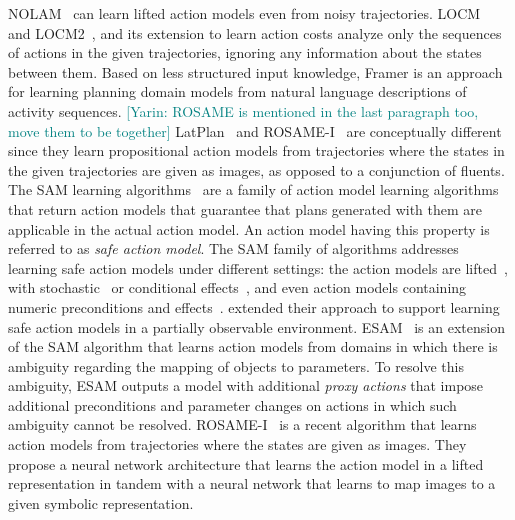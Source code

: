 \documentclass{article}
\theoremstyle{definition}
\theoremstyle{remark}
\newcommand{\sam}{\ac{SAM}\xspace}
\newcommand{\yarin}[1]{{\textcolor{teal}{[Yarin: #1]}}}
\begin{document}
NOLAM~\citep{Lamanna24} can learn lifted action models even from noisy trajectories. 
LOCM~\citep{cresswell2011generalised} and LOCM2~\citep{cresswell2013acquiring}, and its extension to learn action costs \citep{gregory2016domain} analyze only the sequences of actions in the given trajectories, ignoring any information about the states between them. Based on less structured input knowledge, Framer \citep{lindsay2017framer} is an approach for learning planning domain models from natural language descriptions of activity sequences.
\yarin{ROSAME is mentioned in the last paragraph too, move them to be together}
LatPlan~\citep{asai2018classical} and ROSAME-I~\citep{xi2024neuro} are conceptually different since they learn propositional action models from trajectories where the states in the given trajectories are given as images, as opposed to a conjunction of fluents. 
The \sam learning algorithms~\citep{stern2017efficient,mordoch2023learning,juba2021safe,juba2022learning,le2024learning,mordoch2024safe} are a family of action model learning algorithms that return action models that guarantee that plans generated with them are applicable in the actual action model. 
An action model having this property is referred to as \emph{safe action model}.
The \sam family of algorithms addresses learning safe action models under different settings: 
the action models are lifted~\citep{juba2021safe}, with stochastic~\citep{juba2022learning} or conditional effects~\citep{mordoch2024safe}, and even action models containing numeric preconditions and effects~\citep{mordoch2023learning}.
\citet{le2024learning} extended their approach to support learning safe action models in a partially observable environment. 
ESAM~\citep{juba2021safe} is an extension of the \sam algorithm that learns action models from domains in which there is ambiguity regarding the mapping of objects to parameters. To resolve this ambiguity, ESAM outputs a model with additional \emph{proxy actions} that impose additional preconditions and parameter changes on actions in which such ambiguity cannot be resolved. 
ROSAME-I~\citep{xi2024neuro} is a recent algorithm that learns action models from trajectories where the states are given as images. 
They propose a neural network architecture that learns the action model in a lifted representation in tandem with a neural network that learns to map images to a given symbolic representation. 
\end{document}
